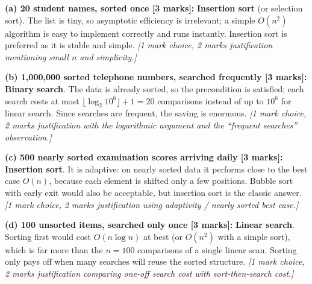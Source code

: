 \documentclass[11pt]{article}
\newcommand{\cle}[1]{{\popxbold\color{popdark}#1}}
\begin{document}
\begin{corrige}
\textbf{(a) 20 student names, sorted once [3 marks]:} \textbf{Insertion sort} (or selection sort). The list is tiny, so asymptotic efficiency is irrelevant; a simple $O(n^2)$ algorithm is easy to implement correctly and runs instantly. Insertion sort is preferred as it is stable and simple. \emph{[1 mark choice, 2 marks justification mentioning small $n$ and simplicity.]}

\textbf{(b) 1,000,000 sorted telephone numbers, searched frequently [3 marks]:} \textbf{Binary search}. The data is already sorted, so the precondition is satisfied; each search costs at most $\lfloor \log_2 10^6 \rfloor + 1 = 20$ comparisons instead of up to $10^6$ for linear search. Since searches are frequent, the saving is enormous. \emph{[1 mark choice, 2 marks justification with the logarithmic argument and the ``frequent searches'' observation.]}

\textbf{(c) 500 nearly sorted examination scores arriving daily [3 marks]:} \textbf{Insertion sort}. It is \cle{adaptive}: on nearly sorted data it performs close to the best case $O(n)$, because each element is shifted only a few positions. Bubble sort with early exit would also be acceptable, but insertion sort is the classic answer. \emph{[1 mark choice, 2 marks justification using adaptivity / nearly sorted best case.]}

\textbf{(d) 100 unsorted items, searched only once [3 marks]:} \textbf{Linear search}. Sorting first would cost $O(n \log n)$ at best (or $O(n^2)$ with a simple sort), which is far more than the $n = 100$ comparisons of a single linear scan. Sorting only pays off when many searches will reuse the sorted structure. \emph{[1 mark choice, 2 marks justification comparing one-off search cost with sort-then-search cost.]}
\end{corrige}
\end{document}
